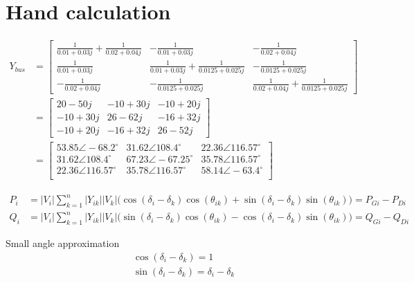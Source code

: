 \documentclass{article}
\begin{document}
\newpage


\section*{Hand calculation}

\begin{align*}
Y_{bus} &= 
\begin{bmatrix}
\frac{1}{0.01+0.03j} + \frac{1}{0.02+0.04j} &-\frac{1}{0.01+0.03j} &-\frac{1}{0.02+0.04j}\\
\frac{1}{0.01+0.03j} &\frac{1}{0.01+0.03j} + \frac{1}{0.0125+0.025j} &-\frac{1}{0.0125+0.025j}\\
-\frac{1}{0.02+0.04j} &-\frac{1}{0.0125+0.025j} &\frac{1}{0.02+0.04j} + \frac{1}{0.0125+0.025j}
\end{bmatrix}\\
&=
\begin{bmatrix}
20-50j &-10+30j &-10+20j\\
-10+30j &26-62j &-16+32j\\
-10+20j &-16+32j &26-52j
\end{bmatrix}\\
&=
\begin{bmatrix}
53.85 \angle -68.2^{\circ} &31.62 \angle 108.4^{\circ} &22.36 \angle 116.57^{\circ}\\
31.62 \angle 108.4^{\circ} &67.23 \angle -67.25^{\circ} &35.78 \angle 116.57^{\circ}\\
22.36 \angle 116.57^{\circ} &35.78 \angle 116.57^{\circ} &58.14 \angle -63.4^{\circ}\\
\end{bmatrix}
\end{align*}

\begin{align*}
P_i &= |V_i| \sum^n_{k=1} |Y_{ik}| |V_k| \Big( \cos(\delta_i - \delta_k) \cos(\theta_{ik}) + \sin(\delta_i - \delta_k) \sin(\theta_{ik}) \Big) = P_{Gi} - P_{Di}\\
Q_i &= |V_i| \sum^n_{k=1} |Y_{ik}| |V_k| \Big( \sin(\delta_i - \delta_k) \cos(\theta_{ik}) - \cos(\delta_i - \delta_k) \sin(\theta_{ik}) \Big) = Q_{Gi} - Q_{Di}
\end{align*}

Small angle approximation
\begin{align*}
&\cos(\delta_i - \delta_k) = 1\\
&\sin(\delta_i - \delta_k) = \delta_i - \delta_k
\end{align*}
\end{document}
